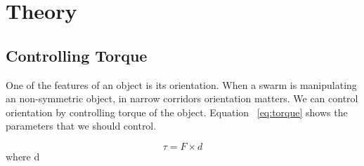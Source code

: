 \section{Theory}
\label{sec:theory}
\subsection{Controlling Torque}

One of the features of an object is its orientation. When a swarm is manipulating an non-symmetric object, in narrow corridors orientation matters. We can control orientation by controlling torque of the object. Equation ~\ref{eq:torque} shows the parameters that we should control.

\begin{equation}
\tau = F \times d\label{eq:torque}
\end{equation}
where d 





